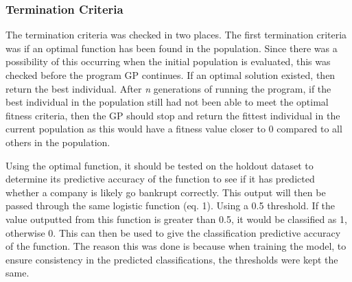 \documentclass[11pt]{article}
\begin{document}
\subsubsection{Termination Criteria}
The termination criteria was checked in two places. The first termination criteria was if an optimal function has been found in the population. Since there was a possibility of this occurring when the initial population is evaluated, this was checked before the program GP continues. If an optimal solution existed, then return the best individual. After \textit{n} generations of running the program, if the best individual in the population still had not been able to meet the optimal fitness criteria, then the GP should stop and return the fittest individual in the current population as this would have a fitness value closer to 0 compared to all others in the population. 

Using the optimal function, it should be tested on the holdout dataset to determine its predictive accuracy of the function to see if it has predicted whether a company is likely go bankrupt correctly. This output will then be passed through the same logistic function (eq. 1). Using a 0.5 threshold. If the value outputted from this function is greater than 0.5, it would be classified as 1, otherwise 0. This can then be used to give the classification predictive accuracy of the function. The reason this was done is because when training the model, to ensure consistency in the predicted classifications, the thresholds were kept the same.
\end{document}
